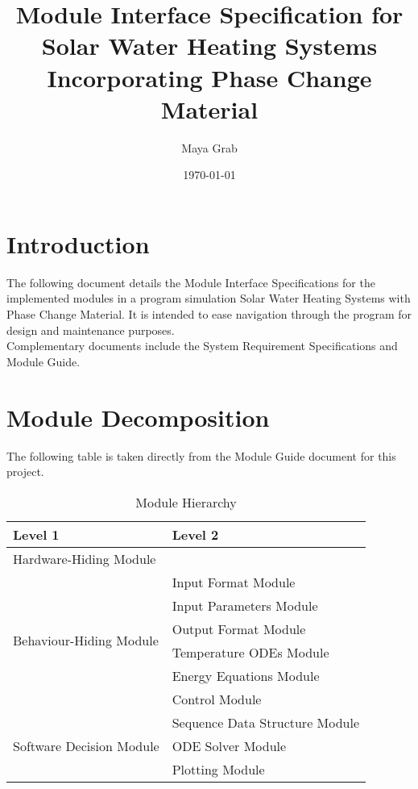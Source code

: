 \documentclass[12pt]{article}
\begin{document}
\title{Module Interface Specification for Solar Water Heating Systems
  Incorporating Phase Change Material} 
\author{Maya Grab}
\date{\today}
	
\maketitle

\tableofcontents

\section{Introduction}
The following document details the Module Interface Specifications for the implemented 
modules in a program simulation Solar Water Heating Systems with Phase Change Material.
 It is intended to ease navigation through the program for design and maintenance purposes.\\
  Complementary documents include the System Requirement Specifications and Module Guide. 

\section{Module Decomposition}
The following table is taken directly from the Module Guide document for this project.
\begin{table}[!h]
\centering
\begin{tabular}{p{} p{}}
\toprule
\textbf{Level 1} & \textbf{Level 2}\\
\midrule

{Hardware-Hiding Module} & ~ \\
\midrule

\multirow{6}{0.3\textwidth}{Behaviour-Hiding Module} & Input Format Module\\
& Input Parameters Module\\
& Output Format Module\\
& Temperature ODEs Module\\
& Energy Equations Module\\ 
& Control Module\\
\midrule

\multirow{3}{0.3\textwidth}{Software Decision Module} & {Sequence Data Structure Module}\\
& ODE Solver Module\\
& Plotting Module\\
\bottomrule

\end{tabular}
\caption{Module Hierarchy}
\label{TblMH}
\end{table}
\end{document}
